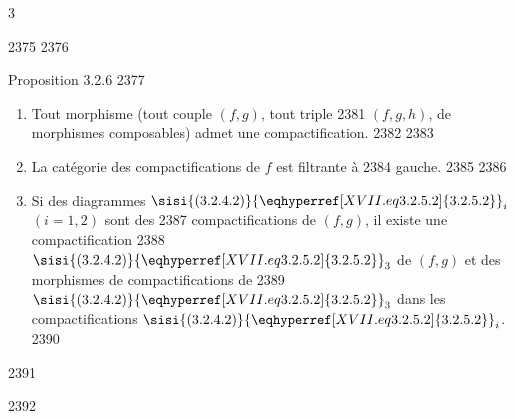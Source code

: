 3	\documentclass[10pt]{../fichiers-configuration-latex/smfart}
\begin{document}
  2375	
  2376	\begin{enonce*}{Proposition 3.2.6}
  2377	\begin{enumerate}
  2378	\renewcommand{\theenumi}{\roman{enumi}}
  2379	\renewcommand{\labelenumi}{(\theenumi)}
  2380	\item Tout morphisme (\resp tout couple $(f,g)$, \resp tout triple
  2381	$(f,g,h)$, de morphismes composables) admet une compactification.
  2382	
  2383	\item La catégorie des compactifications de $f$ est filtrante à
  2384	gauche.
  2385	
  2386	\item Si des diagrammes $\sisi{(3.2.4.2)}{\eqhyperref[XVII.eq3.2.5.2]{3.2.5.2}}_i$ $(i=1,2)$ sont des
  2387	compactifications de $(f,g)$, il existe une compactification
  2388	$\sisi{(3.2.4.2)}{\eqhyperref[XVII.eq3.2.5.2]{3.2.5.2}}_3$ de $(f,g)$ et des morphismes de compactifications de
  2389	$\sisi{(3.2.4.2)}{\eqhyperref[XVII.eq3.2.5.2]{3.2.5.2}}_3$ dans les compactifications $\sisi{(3.2.4.2)}{\eqhyperref[XVII.eq3.2.5.2]{3.2.5.2}}_i$.
  2390	\end{enumerate}
  2391	\end{enonce*}
  2392	
\end{document}

